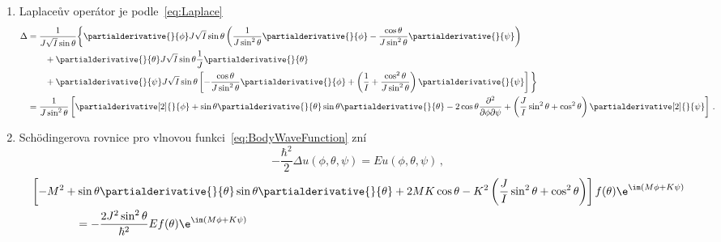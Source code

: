 \begin{solution}
\begin{enumerate}
	\item
		Laplaceův operátor je podle~\eqref{eq:Laplace}
		\begin{align}
			\Delta
				&=\frac{1}{J\sqrt{I}\sin{\theta}}\bigg\{\partialderivative{}{\phi}J\sqrt{I}\sin{\theta}
					\left(\frac{1}{J\sin^{2}\theta}\partialderivative{}{\phi}
					-\frac{\cos{\theta}}{J\sin^{2}\theta}\partialderivative{}{\psi}\right)\nonumber\\
				&\qquad+\partialderivative{}{\theta}J\sqrt{I}\sin{\theta}\frac{1}{J}\partialderivative{}{\theta}\nonumber\\
				&\qquad+\partialderivative{}{\psi}J\sqrt{I}\sin{\theta}
					\left[-\frac{\cos{\theta}}{J\sin^{2}\theta}\partialderivative{}{\phi}
					+\left(\frac{1}{I}+\frac{\cos^{2}\theta}{J\sin^{2}\theta}\right)
					\partialderivative{}{\psi}\right]\bigg\}\nonumber\\
				&=\frac{1}{J\sin^{2}\theta}\left[\partialderivative[2]{}{\phi}
					+\sin{\theta}\partialderivative{}{\theta}\sin{\theta}\partialderivative{}{\theta}
					-2\cos{\theta}\frac{\partial^{2}}{\partial\phi\partial\psi}
					+\left(\frac{J}{I}\sin^{2}\theta+\cos^{2}\theta\right)\partialderivative[2]{}{\psi}\right]\,.
				\label{eq:BodyLaplace}
		\end{align}
		
	\item
		Schödingerova rovnice pro vlnovou funkci~\eqref{eq:BodyWaveFunction} zní
		\begin{equation}
			-\frac{\hbar^{2}}{2}\Delta u(\phi,\theta,\psi)=Eu(\phi,\theta,\psi)\,,
		\end{equation}
		\begin{align}
			&\left[-M^{2}+\sin{\theta}\partialderivative{}{\theta}\sin{\theta}\partialderivative{}{\theta}+2MK\cos{\theta}
				-K^{2}\left(\frac{J}{I}\sin^{2}\theta+\cos^{2}\theta\right)\right]
				f(\theta)\e^{\im\left(M\phi+K\psi\right)}\nonumber\\
			&\qquad\qquad=-\frac{2J^{2}\sin^{2}\theta}{\hbar^{2}}Ef(\theta)
				\e^{\im\left(M\phi+K\psi\right)}
			\label{eq:BodySchrodinger}
		\end{align}


\end{enumerate}
\end{solution}
